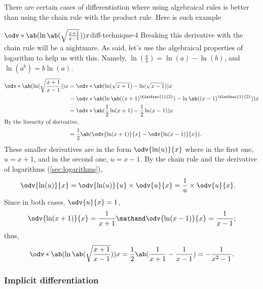 There are certain cases of differentiation where using algebraical rules is better than using the chain rule with the product rule. Here is such example
\begin{exmp}{$\odv*{\ab(\ln\ab(\sqrt{\frac{x + 1}{x - 1}}))}{x}$}{diff-technique-4}
	Breaking this derivative with the chain rule will be a nightmare. As said, let's use the algebraical properties of logarithm to help us with this. Namely, $\ln(\frac{a}{b}) = \ln(a) - \ln(b)$, and $\ln(a^b) = b\ln(a)$.
	\begin{align}
		\odv*{\ab(\ln(\sqrt{\frac{x + 1}{x - 1}}))}{x} & = \odv*{\ab(\ln(\sqrt{x + 1}) - \ln(\sqrt{x - 1}))}{x}                                 \\
		                                               & = \odv*{\ab(\ln\ab((x + 1)^{\flatfrac{1}{2}}) - \ln\ab((x - 1)^{\flatfrac{1}{2}}))}{x} \\
		                                               & = \odv*{\ab(\frac{1}{2}\ln(x + 1) - \frac{1}{2}\ln(x - 1))}{x}                         \\
		\intertext{By the linearity of derivative,}
		                                               & = \frac{1}{2}\ab(\odv{\ln(x + 1)}{x} - \odv{\ln(x - 1)}{x}).
	\end{align}
	These smaller derivatives are in the form $\odv{\ln(u)}{x}$ where in the first one, $u = x + 1$, and in the second one, $u = x - 1$. By the chain rule and the derivative of logarithms (\cref{sec:logarithms}),
	\begin{align}
		\odv{\ln(u)}{x} & = \odv{\ln(u)}{u}\times\odv{u}{x} = \frac{1}{u}\times\odv{u}{x}.
	\end{align}
	Since in both cases, $\odv{u}{x} = 1$,
	\begin{equation}
		\odv{\ln(x + 1)}{x} = \frac{1}{x + 1} \mathand \odv{\ln(x - 1)}{x} = \frac{1}{x - 1};
	\end{equation}
	thus,
	\begin{align}
		\odv*{\ab(\ln\ab(\sqrt{\frac{x + 1}{x - 1}}))}{x} = \frac{1}{2}\ab(\frac{1}{x + 1} - \frac{1}{x - 1}) = -\frac{1}{x^2 - 1}.
	\end{align}
\end{exmp}

\subsubsection{Implicit differentiation}

